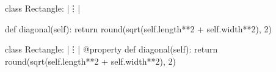 \documentclass[multi, border=6]{standalone}
\begin{document}
  \begin{fixedheightcode}
    class Rectangle:
            |\vdots|
        
        def diagonal(self):
            return round(sqrt(self.length**2 + self.width**2), 2)
  \end{fixedheightcode}

  \begin{fixedheightcode}
    class Rectangle:
            |\vdots|
        @property
        def diagonal(self):
            return round(sqrt(self.length**2 + self.width**2), 2)
  \end{fixedheightcode}
\end{document}
